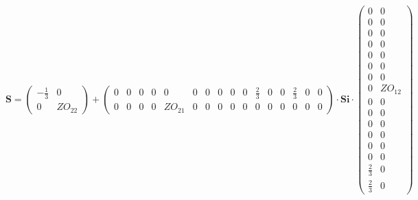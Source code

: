 \[ \mathbf{S} = \left(\begin{smallmatrix} -\frac{1}{3} & 0 \\ 0 & ZO_{22} \end{smallmatrix}\right) + \left(\begin{smallmatrix} 0 & 0 & 0 & 0 & 0 & 0 & 0 & 0 & 0 & 0 & \frac{2}{3} & 0 & 0 & \frac{2}{3} & 0 & 0 \\ 0 & 0 & 0 & 0 & ZO_{21} & 0 & 0 & 0 & 0 & 0 & 0 & 0 & 0 & 0 & 0 & 0 \end{smallmatrix}\right) \cdot \mathbf{Si} \cdot\left(\begin{smallmatrix} 0 & 0 \\ 0 & 0 \\ 0 & 0 \\ 0 & 0 \\ 0 & 0 \\ 0 & 0 \\ 0 & 0 \\ 0 & ZO_{12} \\ 0 & 0 \\ 0 & 0 \\ 0 & 0 \\ 0 & 0 \\ 0 & 0 \\ 0 & 0 \\ \frac{2}{3} & 0 \\ \frac{2}{3} & 0 \end{smallmatrix}\right) \]
